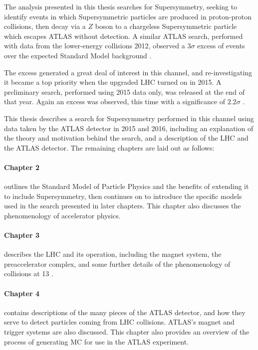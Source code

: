 The analysis presented in this thesis searches for Supersymmetry, seeking to identify events in which Supersymmetric particles are produced in proton-proton collisions, then decay via a $Z$ boson to a chargeless Supersymmetric particle which escapes \ac{ATLAS} without detection. A similar \ac{ATLAS} search, performed with data from the lower-energy collisions 2012, observed a $3\sigma$ excess of events over the expected Standard Model background \cite{SUSY-2014-10}. 

The excess generated a great deal of interest in this channel, and re-investigating it became a top priority when the upgraded \ac{LHC} turned on in 2015. A preliminary search, performed using 2015 data only, was released at the end of that year. Again an excess was observed, this time with a significance of $2.2\sigma$ \cite{ATLAS-CONF-2015-082}. 

This thesis describes a search for Supersymmetry performed in this channel using data taken by the \ac{ATLAS} detector in 2015 and 2016, including an explanation of the theory and motivation behind the search, and a description of the \ac{LHC} and the \ac{ATLAS} detector. The remaining chapters are laid out as follows: 

\paragraph{Chapter 2} outlines the Standard Model of Particle Physics and the benefits of extending it to include Supersymmetry, then continues on to introduce the specific models used in the search presented in later chapters. This chapter also discusses the phenomenology of accelerator physics.

\paragraph{Chapter 3} describes the \ac{LHC} and its operation, including the magnet system, the preaccelerator complex, and some further details of the phenomenology of collisions at 13 \tev.

\paragraph{Chapter 4} contains descriptions of the many pieces of the \ac{ATLAS} detector, and how they serve to detect particles coming from \ac{LHC} collisions. \ac{ATLAS}'s magnet and trigger systems are also discussed. This chapter also provides an overview of the process of generating \ac{MC} for use in the \ac{ATLAS} experiment.


